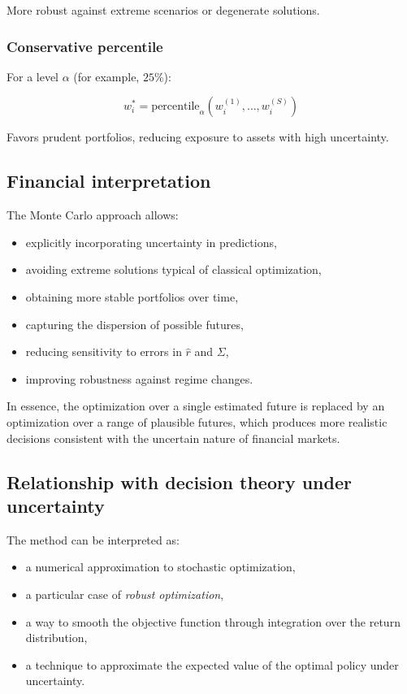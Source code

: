\documentclass[12pt]{article}
\begin{document}
More robust against extreme scenarios or degenerate solutions.

\subsubsection{Conservative percentile}

For a level $\alpha$ (for example, $25\%$):



\[
w^\ast_i = \text{percentile}_\alpha \left( w^{(1)}_i, \dots, w^{(S)}_i \right)
\]



Favors prudent portfolios, reducing exposure to assets with high uncertainty.

\subsection{Financial interpretation}

The Monte Carlo approach allows:

\begin{itemize}
    \item explicitly incorporating uncertainty in predictions,
    \item avoiding extreme solutions typical of classical optimization,
    \item obtaining more stable portfolios over time,
    \item capturing the dispersion of possible futures,
    \item reducing sensitivity to errors in $\hat{r}$ and $\Sigma$,
    \item improving robustness against regime changes.
\end{itemize}

In essence, the optimization over a single estimated future is replaced by an optimization over a range of plausible futures, which produces more realistic decisions consistent with the uncertain nature of financial markets.

\subsection{Relationship with decision theory under uncertainty}

The method can be interpreted as:

\begin{itemize}
    \item a numerical approximation to stochastic optimization,
    \item a particular case of \textit{robust optimization},
    \item a way to smooth the objective function through integration over the return distribution,
    \item a technique to approximate the expected value of the optimal policy under uncertainty.
\end{itemize}
\end{document}
